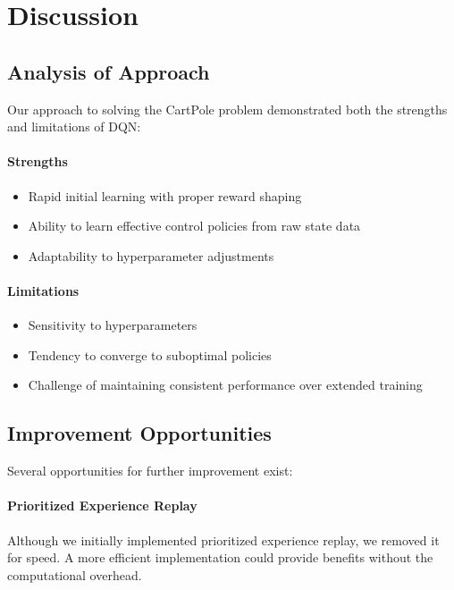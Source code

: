 \documentclass[11pt,a4paper]{article}
\begin{document}
\section{Discussion}

\subsection{Analysis of Approach}

Our approach to solving the CartPole problem demonstrated both the strengths and limitations of DQN:

\paragraph{Strengths}
\begin{itemize}
    \item Rapid initial learning with proper reward shaping
    \item Ability to learn effective control policies from raw state data
    \item Adaptability to hyperparameter adjustments
\end{itemize}

\paragraph{Limitations}
\begin{itemize}
    \item Sensitivity to hyperparameters
    \item Tendency to converge to suboptimal policies
    \item Challenge of maintaining consistent performance over extended training
\end{itemize}

\subsection{Improvement Opportunities}

Several opportunities for further improvement exist:

\paragraph{Prioritized Experience Replay}
Although we initially implemented prioritized experience replay, we removed it for speed. A more efficient implementation could provide benefits without the computational overhead.
\end{document}
